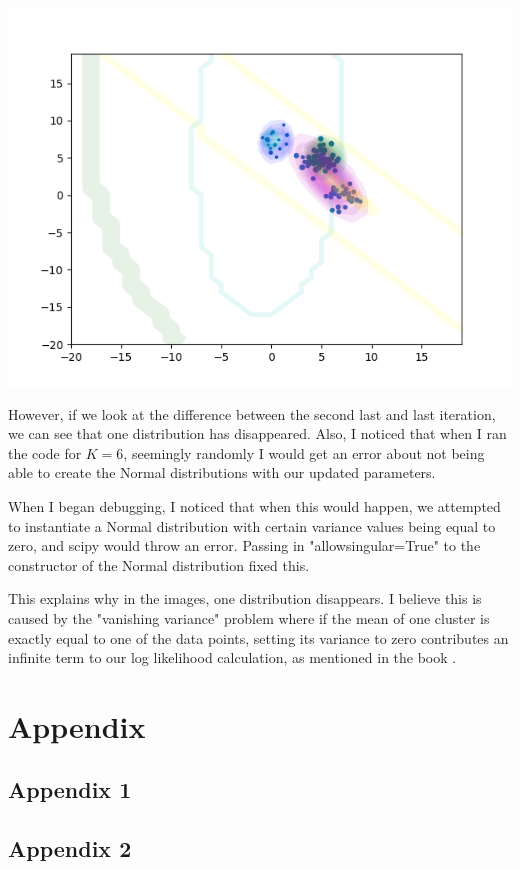 \documentclass[11pt,a4paper]{article}
\begin{document}
\begin{center}
\includegraphics[width=\textwidth]{4_k=6.png}
\end{center}

However, if we look at the difference between the second last and last iteration, we can see that one distribution has disappeared. Also, I noticed that when I ran the code for $K=6$, seemingly randomly I would get an error about not being able to create the Normal distributions with our updated parameters. 

When I began debugging, I noticed that when this would happen, we attempted to instantiate a Normal distribution with certain variance values being equal to zero, and scipy would throw an error. Passing in "allow\textunderscore singular=True" to the constructor of the Normal distribution fixed this. 

This explains why in the images, one distribution disappears. I believe this is caused by the "vanishing variance" problem where if the mean of one cluster is exactly equal to one of the data points, setting its variance to zero contributes an infinite term to our log likelihood calculation, as mentioned in the book \cite{book}.

\section{Appendix}
\subsection{Appendix 1}


\subsection{Appendix 2}




\end{document}
